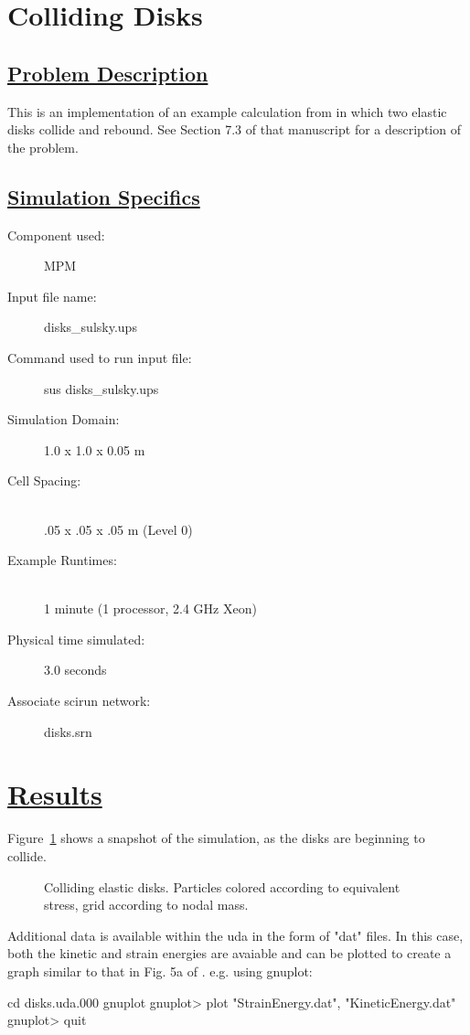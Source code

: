 \documentclass[fleqn]{article}
\begin{document}
\section*{\center Colliding Disks}
\subsection*{\underline{Problem Description}}
This is an implementation of an example calculation from \cite{sulskycmame} in
which two elastic disks collide and rebound.  See Section 7.3 of that
manuscript for a description of the problem.
 
\subsection*{\underline{Simulation Specifics}}
\begin{description} 
\item [Component used:] \hfill MPM
\item [Input file name:] \hfill disks_sulsky.ups
\item [Command used to run input file:]\hfill sus disks_sulsky.ups
\item [Simulation Domain:]\hfill    1.0 x 1.0 x 0.05 m

\item [Cell Spacing:]\hfill \\ 
.05 x .05 x .05 m (Level 0)

\item [Example Runtimes:] \hfill \\
 1 minute   (1 processor, 2.4 GHz Xeon)\\

\item [Physical time simulated:] \hfill 3.0 seconds

\item [Associate scirun network:] \hfill disks.srn

\end{description}

\section*{\underline{Results}}

Figure~\ref{figdisks} shows a snapshot of the simulation, as the disks
are beginning to collide.
\begin{figure}[b]
  \center
  \caption{Colliding elastic disks.  Particles colored according to
equivalent stress, grid according to nodal mass.}
  \label{figdisks}
\end{figure}

Additional data is available within the uda in the form of "dat" files.
In this case, both the kinetic and strain energies are avaiable and can
be plotted to create a graph similar to that in Fig. 5a of \cite{sulskycmame}.
e.g. using gnuplot:

cd disks.uda.000
gnuplot
gnuplot> plot "StrainEnergy.dat", "KineticEnergy.dat"
gnuplot> quit


\end{document}
